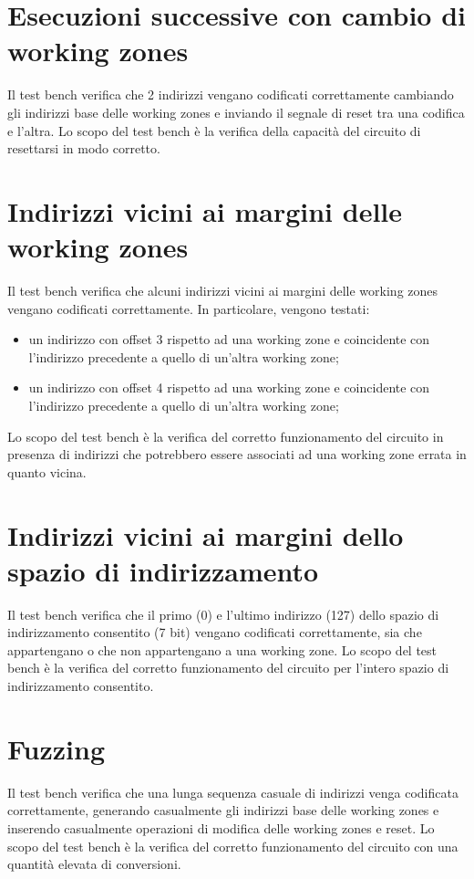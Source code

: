\documentclass[10pt,english, openany]{book}
\begin{document}
\section{Esecuzioni successive con cambio di working zones}

Il test bench verifica che 2 indirizzi vengano codificati correttamente cambiando gli indirizzi base delle working zones e inviando il segnale di reset tra una codifica e l’altra. Lo scopo del test bench è la verifica della capacità del circuito di resettarsi in modo corretto.

\section{Indirizzi vicini ai margini delle working zones}

Il test bench verifica che alcuni indirizzi vicini ai margini delle working zones vengano codificati correttamente. In particolare, vengono testati:
\begin{itemize}
    \item un indirizzo con offset 3 rispetto ad una working zone e coincidente        con l’indirizzo precedente a quello di un’altra working zone;
    \item un indirizzo con offset 4 rispetto ad una working zone e coincidente        con l’indirizzo precedente a quello di un’altra working zone;
\end{itemize}{}
Lo scopo del test bench è la verifica del corretto funzionamento del circuito in presenza di indirizzi che potrebbero essere associati ad una working zone errata in quanto vicina.
 
\section{Indirizzi vicini ai margini dello spazio di indirizzamento}

Il test bench verifica che il primo (0) e l’ultimo indirizzo (127) dello spazio di indirizzamento consentito (7 bit) vengano codificati correttamente, sia che appartengano o che non appartengano a una working zone. Lo scopo del test bench è la verifica del corretto funzionamento del circuito per l’intero spazio di indirizzamento consentito.

\section{Fuzzing}

Il test bench verifica che una lunga sequenza casuale di indirizzi venga codificata correttamente, generando casualmente gli indirizzi base delle working zones e inserendo casualmente operazioni di modifica delle working zones e reset. Lo scopo del test bench è la verifica del corretto funzionamento del circuito con una quantità elevata di conversioni.
\end{document}
